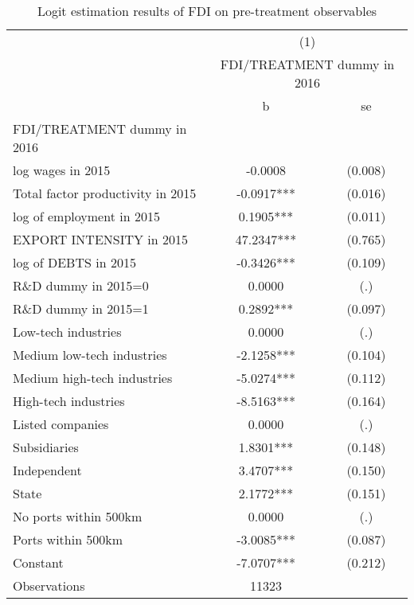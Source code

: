 \begin{table}[htbp]\centering
\def\sym#1{\ifmmode^{#1}\else\(^{#1}\)\fi}
\caption{Logit estimation results of FDI on pre-treatment observables }
\label{selection_logit}
\begin{tabular}{l*{1}{cc}}
\hline\hline
                &\multicolumn{2}{c}{(1)}\\
                &\multicolumn{2}{c}{FDI/TREATMENT dummy in 2016}\\
                &        b   &       se\\
\hline
FDI/TREATMENT dummy in 2016&            &         \\
log wages in 2015&  -0.0008   &  (0.008)\\
Total factor productivity in 2015&  -0.0917***&  (0.016)\\
log of employment in 2015&   0.1905***&  (0.011)\\
EXPORT INTENSITY in 2015&  47.2347***&  (0.765)\\
 log of DEBTS in 2015&  -0.3426***&  (0.109)\\
R\&D dummy in 2015=0&   0.0000   &      (.)\\
R\&D dummy in 2015=1&   0.2892***&  (0.097)\\
Low-tech industries&   0.0000   &      (.)\\
Medium low-tech industries&  -2.1258***&  (0.104)\\
Medium high-tech industries&  -5.0274***&  (0.112)\\
High-tech industries&  -8.5163***&  (0.164)\\
 Listed companies&   0.0000   &      (.)\\
 Subsidiaries   &   1.8301***&  (0.148)\\
 Independent    &   3.4707***&  (0.150)\\
 State          &   2.1772***&  (0.151)\\
No ports within 500km&   0.0000   &      (.)\\
Ports within 500km&  -3.0085***&  (0.087)\\
Constant        &  -7.0707***&  (0.212)\\
\hline
Observations    &    11323   &         \\
\hline\hline
\end{tabular}
\end{table}
